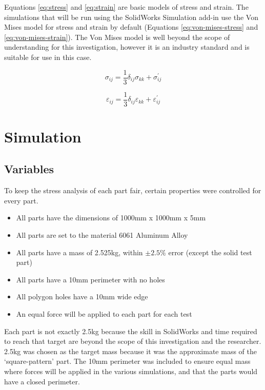 \documentclass[12pt, letterpaper]{article}
\newcommand{\sorta}[1]{`#1'}
\begin{document}
Equations \ref{eq:stress} and \ref{eq:strain} are basic models of stress and strain. The simulations that will be run using the SolidWorks Simulation add-in use the Von Mises model for stress and strain by default (Equations \ref{eq:von-mises-stress} and \ref{eq:von-mises-strain}). The Von Mises model is well beyond the scope of understanding for this investigation, however it is an industry standard and is suitable for use in this case. 

\begin{equation}
	\label{eq:von-mises-stress}
	\sigma_{ij} = \frac{1}{3} \delta_{ij} \sigma_{kk} + \sigma^\prime_{ij}
\end{equation}

\begin{equation}
	\label{eq:von-mises-strain}
	\varepsilon_{ij} = \frac{1}{3} \delta_{ij} \varepsilon_{kk} + \varepsilon^\prime_{ij}
\end{equation}

\section{Simulation}
\label{sec:simulation}

\subsection{Variables}
\label{sec:variables}

To keep the stress analysis of each part fair, certain properties were controlled for every part. 

\begin{itemize}
\item All parts have the dimensions of 1000mm x 1000mm x 5mm
\item All parts are set to the material 6061 Aluminum Alloy
\item All parts have a mass of 2.525kg, within $\pm2.5\%$ error (except the solid test part)
\item All parts have a 10mm perimeter with no holes
\item All polygon holes have a 10mm wide edge
\item An equal force will be applied to each part for each test
\end{itemize}

Each part is not exactly 2.5kg because the skill in SolidWorks and time required to reach that target are beyond the scope of this investigation and the researcher. 2.5kg was chosen as the target mass because it was the approximate mass of the \sorta{square-pattern} part. The 10mm perimeter was included to ensure equal mass where forces will be applied in the various simulations, and that the parts would have a closed perimeter. 
\end{document}
